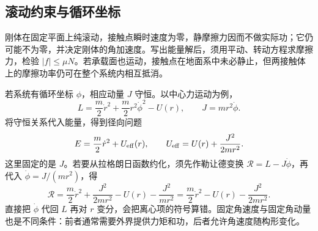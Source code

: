 \documentclass[11pt,openany,fontset=fandol]{ctexbook}
\theoremstyle{definition}\newtheorem{example}{例}[chapter]\newtheorem{exercise}{习题}[chapter]
\begin{document}
\subsection{滚动约束与循环坐标}
刚体在固定平面上纯滚动，接触点瞬时速度为零，静摩擦力因而不做实际功；它仍可能不为零，并决定刚体的角加速度。写出能量解后，须用平动、转动方程求摩擦力，检验 $|f|\le\mu N$。若承载面也运动，接触点在地面系中未必静止，但两接触体上的摩擦功率仍可在整个系统内相互抵消。

若系统有循环坐标 $\phi$，相应动量 $J$ 守恒。以中心力运动为例，
\[
L=\frac m2\dot r^2+\frac m2r^2\dot\phi^2-U(r),\qquad
J=mr^2\dot\phi.
\]
将守恒关系代入能量，得到径向问题
\begin{equation}\label{mp5:eq:l5-central-reduction}
E=\frac m2\dot r^2+U_{\rm eff}(r),\qquad
U_{\rm eff}=U(r)+\frac{J^2}{2mr^2}.
\end{equation}
这里固定的是 $J$。若要从拉格朗日函数约化，须先作勒让德变换 $\mathcal R=L-J\dot\phi$，再代入 $\dot\phi=J/(mr^2)$，得
\[
\mathcal R=\frac m2\dot r^2+\frac{J^2}{2mr^2}-U(r)-\frac{J^2}{mr^2}
=\frac m2\dot r^2-U(r)-\frac{J^2}{2mr^2}.
\]
直接把 $\dot\phi$ 代回 $L$ 再对 $r$ 变分，会把离心项的符号算错。固定角速度与固定角动量也是不同条件：前者通常需要外界提供力矩和功，后者允许角速度随构形变化。
\end{document}
